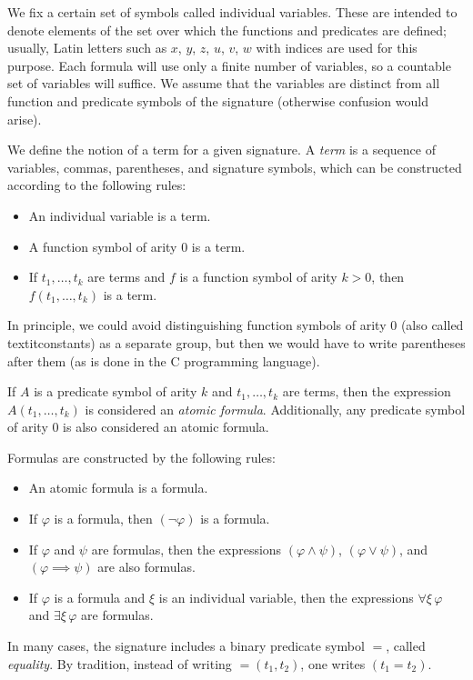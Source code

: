 We fix a certain set of symbols called individual variables. These are intended to denote elements of the set over which the functions and predicates are defined; usually, Latin letters such as $x$, $y$, $z$, $u$, $v$, $w$ with indices are used for this purpose. Each formula will use only a finite number of variables, so a countable set of variables will suffice. We assume that the variables are distinct from all function and predicate symbols of the signature (otherwise confusion would arise).

We define the notion of a term for a given signature. A \textit{term} is a sequence of variables, commas, parentheses, and signature symbols, which can be constructed according to the following rules:
\begin{itemize}
  \item An individual variable is a term.
  \item A function symbol of arity 0 is a term.
  \item If $t_1, \dots, t_k$ are terms and $f$ is a function symbol of arity $k > 0$, then $f(t_1, \dots, t_k)$ is a term.
\end{itemize}
In principle, we could avoid distinguishing function symbols of arity 0 (also called textit{constants}) as a separate group, but then we would have to write parentheses after them (as is done in the C programming language).

If $A$ is a predicate symbol of arity $k$ and $t_1, \dots, t_k$ are terms, then the expression $A(t_1, \dots, t_k)$ is considered an \textit{atomic formula}. Additionally, any predicate symbol of arity 0 is also considered an atomic formula.

Formulas are constructed by the following rules:
\begin{itemize}
  \item An atomic formula is a formula.
  \item If $\varphi$ is a formula, then $(\lnot\varphi)$ is a formula.
  \item If $\varphi$ and $\psi$ are formulas, then the expressions $(\varphi \land \psi)$, $(\varphi \lor \psi)$, and $(\varphi \implies \psi)$ are also formulas.
  \item If $\varphi$ is a formula and $\xi$ is an individual variable, then the expressions $\forall \xi\, \varphi$ and $\exists \xi\, \varphi$ are formulas.
\end{itemize}

In many cases, the signature includes a binary predicate symbol $=$, called \textit{equality}. By tradition, instead of writing $=(t_1, t_2)$, one writes $(t_1 = t_2)$.
\pagebreak
\iffalse %
